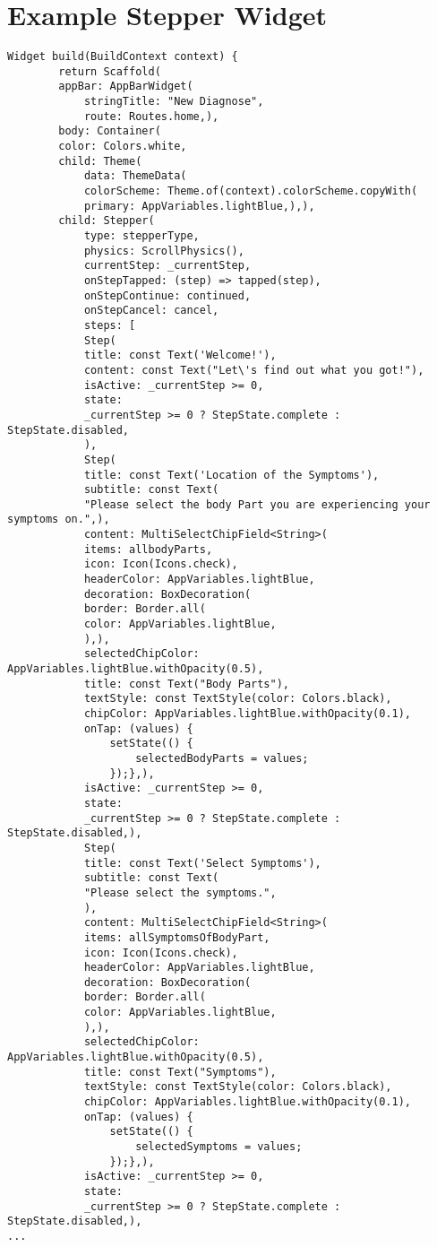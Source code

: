 \tocless\chapter{Example Stepper Widget}
\begin{lstlisting}[caption=Stepper Example, basicstyle=\tiny]
	Widget build(BuildContext context) {
		return Scaffold(
		appBar: AppBarWidget(
			stringTitle: "New Diagnose",
			route: Routes.home,),
		body: Container(
		color: Colors.white,
		child: Theme(
			data: ThemeData(
			colorScheme: Theme.of(context).colorScheme.copyWith(
			primary: AppVariables.lightBlue,),),
		child: Stepper(
			type: stepperType,
			physics: ScrollPhysics(),
			currentStep: _currentStep,
			onStepTapped: (step) => tapped(step),
			onStepContinue: continued,
			onStepCancel: cancel,
			steps: [
			Step(
			title: const Text('Welcome!'),
			content: const Text("Let\'s find out what you got!"),
			isActive: _currentStep >= 0,
			state:
			_currentStep >= 0 ? StepState.complete : StepState.disabled,
			),
			Step(
			title: const Text('Location of the Symptoms'),
			subtitle: const Text(
			"Please select the body Part you are experiencing your symptoms on.",),
			content: MultiSelectChipField<String>(
			items: allbodyParts,
			icon: Icon(Icons.check),
			headerColor: AppVariables.lightBlue,
			decoration: BoxDecoration(
			border: Border.all(
			color: AppVariables.lightBlue,
			),),
			selectedChipColor: AppVariables.lightBlue.withOpacity(0.5),
			title: const Text("Body Parts"),
			textStyle: const TextStyle(color: Colors.black),
			chipColor: AppVariables.lightBlue.withOpacity(0.1),
			onTap: (values) {
				setState(() {
					selectedBodyParts = values;
				});},),
			isActive: _currentStep >= 0,
			state:
			_currentStep >= 0 ? StepState.complete : StepState.disabled,),
			Step(
			title: const Text('Select Symptoms'),
			subtitle: const Text(
			"Please select the symptoms.",
			),
			content: MultiSelectChipField<String>(
			items: allSymptomsOfBodyPart,
			icon: Icon(Icons.check),
			headerColor: AppVariables.lightBlue,
			decoration: BoxDecoration(
			border: Border.all(
			color: AppVariables.lightBlue,
			),),
			selectedChipColor: AppVariables.lightBlue.withOpacity(0.5),
			title: const Text("Symptoms"),
			textStyle: const TextStyle(color: Colors.black),
			chipColor: AppVariables.lightBlue.withOpacity(0.1),
			onTap: (values) {
				setState(() {
					selectedSymptoms = values;
				});},),
			isActive: _currentStep >= 0,
			state:
			_currentStep >= 0 ? StepState.complete : StepState.disabled,),
...
\end{lstlisting}
\pagebreak

